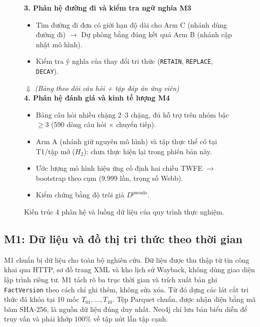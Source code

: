 \begin{figure}[htbp]
\begin{minipage}{0.95\textwidth}
{{        \textbf{\large 3. Phân hệ đường đi và kiểm tra ngữ nghĩa M3}
        \begin{itemize}\setlength{\itemsep}{1pt}\setlength{\parskip}{0pt}
            \item Tìm đường đi đơn có giới hạn độ dài cho Arm C (nhánh dùng đường đi) $\to$ Dự phòng bằng đúng kết quả Arm B (nhánh cập nhật mô hình).
            \item Kiểm tra ý nghĩa của thay đổi tri thức (\texttt{RETAIN}, \texttt{REPLACE}, \texttt{DECAY}).
        \end{itemize}
        \vspace{0.05cm}
        \centering $\boldsymbol{\Downarrow}$ \textit{(Bảng theo dõi câu hỏi + tập đáp án ứng viên)} \\[0.15cm]
        \textbf{\large 4. Phân hệ đánh giá và kinh tế lượng M4}
        \begin{itemize}\setlength{\itemsep}{1pt}\setlength{\parskip}{0pt}
            \item Bảng câu hỏi nhiều chặng 2--3 chặng, đủ hỗ trợ trên nhóm bậc $\geq 3$ (590 dòng câu hỏi $\times$ chuyển tiếp).
            \item Arm A (nhánh giữ nguyên mô hình) và tập thực thể có tại T1/tập mở ($H_2$): chưa thực hiện lại trong phiên bản này.
            \item Ước lượng mô hình hiệu ứng cố định hai chiều TWFE $\to$ bootstrap theo cụm (9.999 lần, trọng số Webb).
            \item Kiểm chứng bằng độ trôi giả $D^{\text{pseudo}}$.
        \end{itemize}
        \vspace{0.1cm}
    }
}
\caption{Kiến trúc 4 phân hệ và luồng dữ liệu của quy trình thực nghiệm.}
\label{fig:architecture_pipeline}
\end{minipage}
\end{figure}

\subsection{M1: Dữ liệu và đồ thị tri thức theo thời gian}
M1 chuẩn bị dữ liệu cho toàn bộ nghiên cứu. Dữ liệu được thu thập từ tin công khai qua HTTP, sơ đồ trang XML và kho lịch sử Wayback, không dùng giao diện lập trình riêng tư. M1 tách rõ ba trục thời gian và trích xuất bản ghi \texttt{FactVersion} theo cách chỉ ghi thêm, không sửa xóa. Từ đó dựng các lát cắt tri thức đã khóa tại 10 mốc $T_{01}, \dots, T_{10}$. Tệp Parquet chuẩn, được nhận diện bằng mã băm SHA-256, là nguồn dữ liệu đúng duy nhất. Neo4j chỉ lưu bản biểu diễn để truy vấn và phải khớp $100\%$ về tập nút lẫn tập cạnh.


